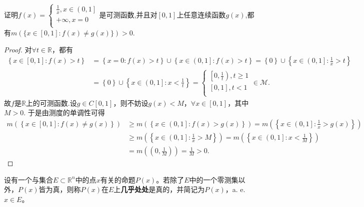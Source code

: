 \documentclass[../../main.tex]{subfiles}%
\begin{document}
\begin{example}
证明$f\left( x \right) =\begin{cases}
\frac{1}{x},x\in \left( 0,1 \right]\\
+\infty ,x=0\\
\end{cases}$是可测函数,并且对$[0,1]$上任意连续函数$g(x)$,都有$m(\{x\in [0,1]:f(x)\ne g(x)\})>0$.
\end{example}
\begin{proof}

对$\forall t\in \mathbb{R}$，都有
\begin{align*}
\left\{ x\in \left[ 0,1 \right] :f\left( x \right) >t \right\} &=\left\{ x=0:f\left( x \right) >t \right\} \cup \left\{ x\in \left( 0,1 \right] :f\left( x \right) >t \right\} =\left\{ 0 \right\} \cup \left\{ x\in \left( 0,1 \right] :\frac{1}{x}>t \right\} 
\\
&=\left\{ 0 \right\} \cup \left\{ x\in \left( 0,1 \right] :x<\frac{1}{t} \right\} =\begin{cases}
\left[ 0,\frac{1}{t} \right) ,t\geqslant 1\\
\left[ 0,1 \right] ,t<1\\
\end{cases}\in \mathscr{M} .
\end{align*}
故$f$是$\mathbb{R}$上的可测函数.设$g\in C\left[ 0,1 \right]$，则不妨设$g\left( x \right) <M$，$\forall x\in \left[ 0,1 \right]$，其中$M>0$.
于是由测度的单调性可得
\begin{align*}
m\left( \left\{ x\in \left[ 0,1 \right] :f\left( x \right) \ne g\left( x \right) \right\} \right) &\geqslant m\left( \left\{ x\in \left( 0,1 \right] :f\left( x \right) >g\left( x \right) \right\} \right) =m\left( \left\{ x\in \left( 0,1 \right] :\frac{1}{x}>g\left( x \right) \right\} \right) 
\\
&\geqslant m\left( \left\{ x\in \left( 0,1 \right] :\frac{1}{x}>M \right\} \right) =m\left( \left\{ x\in \left( 0,1 \right] :x<\frac{1}{M} \right\} \right) 
\\
&=m\left( \left( 0,\frac{1}{M} \right) \right) =\frac{1}{M}>0.
\end{align*}

\end{proof}

\begin{definition}
设有一个与集合$E \subset \mathbb{R}^n$中的点$x$有关的命题$P(x)$。若除了$E$中的一个零测集以外，$P(x)$皆为真，则称$P(x)$在$E$上\textbf{几乎处处}是真的，并简记为$P(x)$，a. e.$ x\in E$。
\end{definition}
\end{document}
